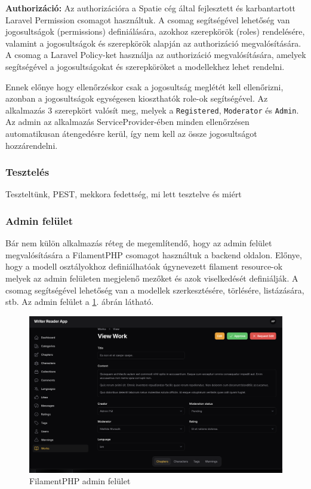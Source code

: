 \textbf{Authorizáció:} Az authorizációra a Spatie cég által fejlesztett és karbantartott Laravel Permission csomagot \cite{LaravelPermissions} használtuk. A csomag segítségével lehetőség van jogosultságok (permissions) definiálására, azokhoz szerepkörök (roles) rendelésére, valamint a jogosultságok és szerepkörök alapján az authorizáció megvalósítására. A csomag a Laravel Policy-ket használja az authorizáció megvalósítására, amelyek segítségével a jogosultságokat és szerepköröket a modellekhez lehet rendelni.

Ennek előnye hogy ellenőrzéskor csak a jogosultság meglétét kell ellenőrizni, azonban a jogosultságok egységesen kioszthatók role-ok segítségével. Az alkalmazás 3 szerepkört valósít meg, melyek a \texttt{Registered}, \texttt{Moderator} és \texttt{Admin}. Az admin az alkalmazás ServiceProvider-ében minden ellenőrzésen automatikusan átengedésre kerül, így nem kell az össze jogosultságot hozzárendelni.\\


\subsubsection{Tesztelés}

Teszteltünk, PEST, mekkora fedettség, mi lett tesztelve és miért

\subsubsection{Admin felület}

Bár nem külön alkalmazás réteg de megemlítendő, hogy az admin felület megvalósítására a FilamentPHP csomagot \cite{FilamentPHP} használtuk a backend oldalon. Előnye, hogy a modell osztályokhoz definiálhatóak úgynevezett filament resource-ok melyek az admin felületen megjelenő mezőket és azok viselkedését definiálják. A csomag segítségével lehetőség van a modellek szerkesztésére, törlésére, listázására, stb. Az admin felület a \ref{fig:admin}. ábrán látható.

\begin{figure}[H]
    \centering
    \includegraphics[scale=0.25]{./figures/admin-panel.png}
    \caption{FilamentPHP admin felület}
    \label{fig:admin}
\end{figure}

